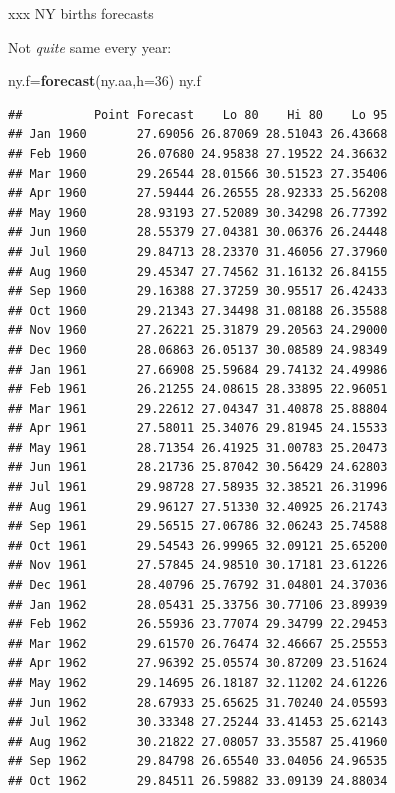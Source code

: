 \documentclass[ignorenonframetext,]{beamer}
\newenvironment{Shaded}{\begin{snugshade}}{\end{snugshade}}
\newcommand{\DataTypeTok}[1]{\textcolor[rgb]{0.13,0.29,0.53}{#1}}
\newcommand{\DecValTok}[1]{\textcolor[rgb]{0.00,0.00,0.81}{#1}}
\newcommand{\KeywordTok}[1]{\textcolor[rgb]{0.13,0.29,0.53}{\textbf{#1}}}
\newcommand{\NormalTok}[1]{#1}
\begin{document}
\begin{frame}[fragile]{xxx NY births forecasts}
\protect\hypertarget{xxx-ny-births-forecasts}{}

Not \emph{quite} same every year:

\small

\begin{Shaded}
\begin{Highlighting}[]
\NormalTok{ny.f=}\KeywordTok{forecast}\NormalTok{(ny.aa,}\DataTypeTok{h=}\DecValTok{36}\NormalTok{)}
\NormalTok{ny.f}
\end{Highlighting}
\end{Shaded}

\begin{verbatim}
##          Point Forecast    Lo 80    Hi 80    Lo 95
## Jan 1960       27.69056 26.87069 28.51043 26.43668
## Feb 1960       26.07680 24.95838 27.19522 24.36632
## Mar 1960       29.26544 28.01566 30.51523 27.35406
## Apr 1960       27.59444 26.26555 28.92333 25.56208
## May 1960       28.93193 27.52089 30.34298 26.77392
## Jun 1960       28.55379 27.04381 30.06376 26.24448
## Jul 1960       29.84713 28.23370 31.46056 27.37960
## Aug 1960       29.45347 27.74562 31.16132 26.84155
## Sep 1960       29.16388 27.37259 30.95517 26.42433
## Oct 1960       29.21343 27.34498 31.08188 26.35588
## Nov 1960       27.26221 25.31879 29.20563 24.29000
## Dec 1960       28.06863 26.05137 30.08589 24.98349
## Jan 1961       27.66908 25.59684 29.74132 24.49986
## Feb 1961       26.21255 24.08615 28.33895 22.96051
## Mar 1961       29.22612 27.04347 31.40878 25.88804
## Apr 1961       27.58011 25.34076 29.81945 24.15533
## May 1961       28.71354 26.41925 31.00783 25.20473
## Jun 1961       28.21736 25.87042 30.56429 24.62803
## Jul 1961       29.98728 27.58935 32.38521 26.31996
## Aug 1961       29.96127 27.51330 32.40925 26.21743
## Sep 1961       29.56515 27.06786 32.06243 25.74588
## Oct 1961       29.54543 26.99965 32.09121 25.65200
## Nov 1961       27.57845 24.98510 30.17181 23.61226
## Dec 1961       28.40796 25.76792 31.04801 24.37036
## Jan 1962       28.05431 25.33756 30.77106 23.89939
## Feb 1962       26.55936 23.77074 29.34799 22.29453
## Mar 1962       29.61570 26.76474 32.46667 25.25553
## Apr 1962       27.96392 25.05574 30.87209 23.51624
## May 1962       29.14695 26.18187 32.11202 24.61226
## Jun 1962       28.67933 25.65625 31.70240 24.05593
## Jul 1962       30.33348 27.25244 33.41453 25.62143
## Aug 1962       30.21822 27.08057 33.35587 25.41960
## Sep 1962       29.84798 26.65540 33.04056 24.96535
## Oct 1962       29.84511 26.59882 33.09139 24.88034

\end{verbatim}
\end{frame}
\end{document}
